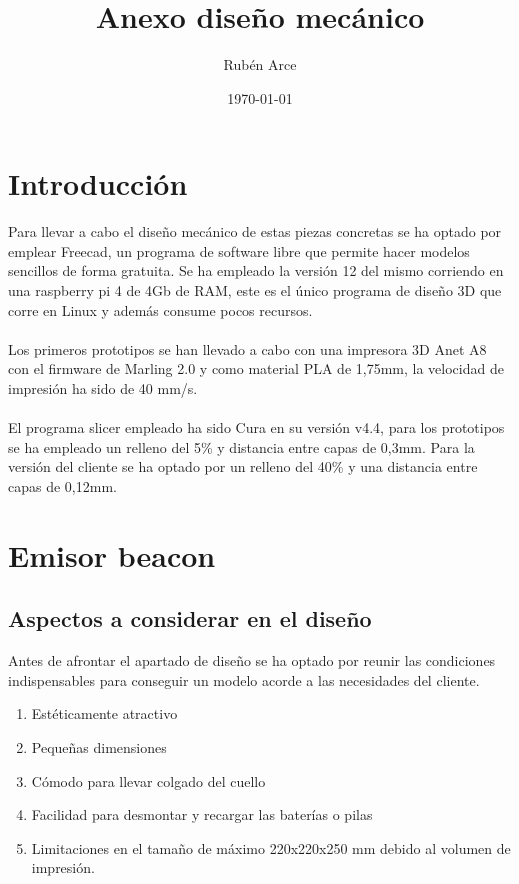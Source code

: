 \documentclass[a4paper ,12pt, onecolumn]{article}
\begin{document}
\title{Anexo diseño mecánico}

\author{Rubén Arce}
\date{\today}
\maketitle
\cleardoublepage
\tableofcontents
\listoffigures
\cleardoublepage

\section{Introducción}
Para llevar a cabo el diseño mecánico de estas piezas concretas se ha optado por emplear Freecad, un
programa de software libre que permite hacer modelos sencillos de forma gratuita.
Se ha empleado la versión 12 del mismo corriendo en una raspberry pi 4 de 4Gb de RAM, este es el único
programa de diseño 3D que corre en Linux  y además consume pocos recursos.
\paragraph{}
Los primeros prototipos se han llevado a cabo con una impresora 3D Anet A8 con el firmware de Marling
2.0 y como material PLA de 1,75mm, la velocidad de impresión ha sido de 40 mm/s.
\paragraph{}
El programa slicer empleado ha sido Cura en su versión v4.4, para los prototipos se ha empleado un relleno del 5\% y distancia
entre capas de 0,3mm. Para la versión del cliente se ha optado por un relleno del 40\% y una distancia entre capas de 0,12mm.
\section{Emisor beacon}
    \subsection{Aspectos a considerar en el diseño}
        Antes de afrontar el apartado de diseño se ha optado por reunir las condiciones indispensables para 
        conseguir un modelo acorde a las necesidades del cliente.
        \begin{enumerate}
            \item Estéticamente atractivo
            \item Pequeñas dimensiones
            \item Cómodo para llevar colgado del cuello
            \item Facilidad para desmontar y recargar las baterías o pilas
            \item Limitaciones en el tamaño de máximo 220x220x250 mm debido al volumen de impresión.
        \end{enumerate}
\end{document}
